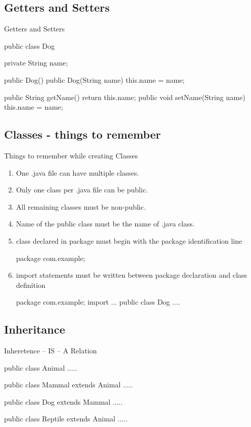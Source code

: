 \documentclass[11pt]{beamer}
\begin{document}
\subsection{Getters and Setters}
\begin{frame}[containsverbatim]{Getters and Setters}
\begin{java}
public class Dog{
  private String name;  
  
  public Dog(){
  }
  public Dog(String name){
    this.name = name;
  }
  
  public String getName(){
    return this.name;  
  }
  public void setName(String name){
    this.name = name;
  }  
}
\end{java}
\end{frame}

\subsection{Classes - things to remember}
\begin{frame}{Things to remember while creating Classes}

\begin{enumerate}
\item One .java file can have multiple classes.
\item Only one class per .java file can be public.
\item All remaining classes must be non-public.
\item Name of the public class must be the name of .java class.
\item class declared in package must begin with the package identification line
\begin{java}
package com.example;
\end{java}


\item import statements must be written between package declaration and class definition
\begin{java}
package com.example;
import ...
public class Dog{
  ....
}
\end{java}
\end{enumerate}
\end{frame}

\subsection{Inheritance}
\begin{frame}[containsverbatim]{Inheretence -- IS -- A Relation}
\begin{java}
public class Animal{
	.....
}

  public class Mammal extends Animal{
  	.....
  }

    public class Dog extends Mammal{
    		.....
    }

  public class Reptile extends Animal{
  	.....
  }
\end{java}
\end{frame}
\end{document}
